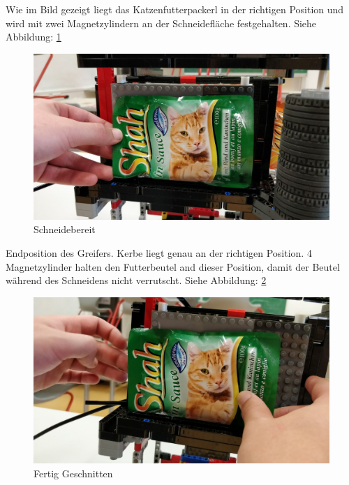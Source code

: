 Wie im Bild gezeigt liegt das Katzenfutterpackerl in der richtigen Position und wird mit zwei Magnetzylindern an der Schneidefläche festgehalten. Siehe Abbildung: \ref{Schneidebereit}

\begin{figure}[H]
\begin{center}
\includegraphics[width=13cm]{Bilder/Ablauf_1_png/Schneidebereit.jpeg}
\caption{Schneidebereit}
\label{Schneidebereit}
\end{center}
\end{figure}

Endposition des Greifers. Kerbe liegt genau an der richtigen Position. 4 Magnetzylinder halten den Futterbeutel and dieser Position, damit der Beutel während des Schneidens nicht verrutscht. Siehe Abbildung: \ref{Fertig Geschnitten}

\begin{figure}[H]
\begin{center}
\includegraphics[width=13cm]{Bilder/Ablauf_1_png/Fertig_Geschnitten}
\caption{Fertig Geschnitten}
\label{Fertig Geschnitten}
\end{center}
\end{figure}

